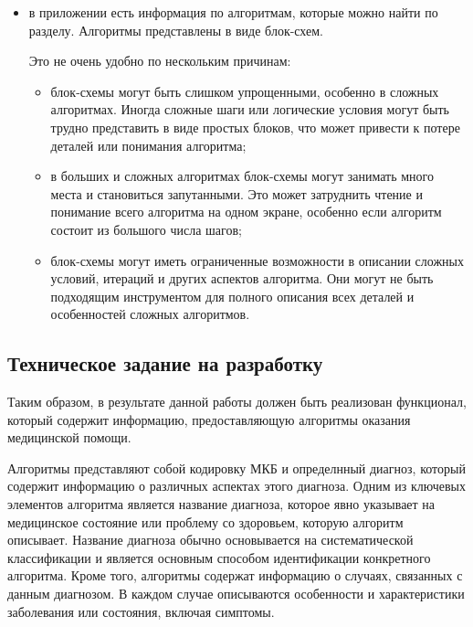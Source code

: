 \begin{enumerate}
    \begin{itemize}
        
        \item в приложении есть информация по алгоритмам, которые можно найти по разделу. Алгоритмы представлены в виде блок-схем.

        Это не очень удобно по нескольким причинам:
         \begin{itemize}
            \item блок-схемы могут быть слишком упрощенными, особенно в сложных алгоритмах. Иногда сложные шаги или логические условия могут быть трудно представить в виде простых блоков, что может привести к потере деталей или понимания алгоритма;
            \item в больших и сложных алгоритмах блок-схемы могут занимать много места и становиться запутанными. Это может затруднить чтение и понимание всего алгоритма на одном экране, особенно если алгоритм состоит из большого числа шагов;
            \item блок-схемы могут иметь ограниченные возможности в описании сложных условий, итераций и других аспектов алгоритма. Они могут не быть подходящим инструментом для полного описания всех деталей и особенностей сложных алгоритмов.
         \end{itemize}
    \end{itemize}
\end{enumerate}

\subsection{Техническое задание на разработку}

Таким образом, в результате данной работы должен быть реализован функционал, который содержит информацию, предоставляющую алгоритмы оказания медицинской помощи. 

Алгоритмы представляют собой кодировку МКБ и определнный диагноз, который содержит информацию о различных аспектах этого диагноза.
Одним из ключевых элементов алгоритма является название диагноза, которое явно указывает на медицинское состояние или проблему со здоровьем, которую алгоритм описывает. Название диагноза обычно основывается на систематической классификации и является основным способом идентификации конкретного алгоритма.
Кроме того, алгоритмы содержат информацию о случаях, связанных с данным диагнозом. В каждом случае описываются особенности и характеристики заболевания или состояния, включая симптомы.

